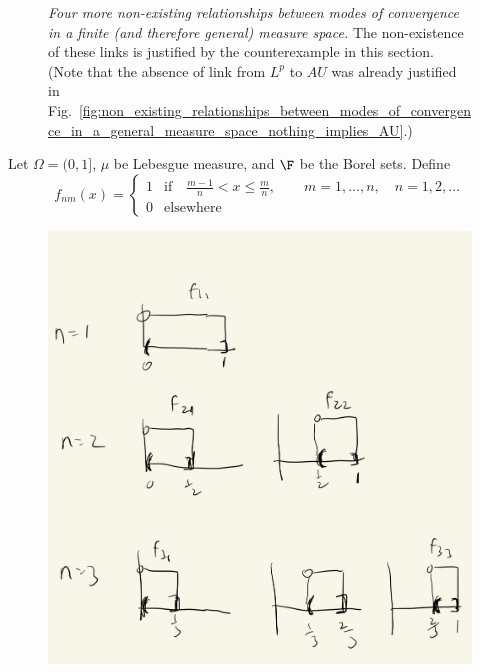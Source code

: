 \documentclass{article} %
\begin{document}
\begin{figure}[H]
\centering	
{}
\caption{ \textit{Four more non-existing relationships between modes of convergence in a finite (and therefore general) measure space.}  The non-existence of these links is justified by the counterexample in this section. (Note that the absence of link from $L^p$ to $AU$ was already justified in Fig.~\ref{fig:non_existing_relationships_between_modes_of_convergence_in_a_general_measure_space_nothing_implies_AU}.)}
\label{fig:non_existing_relationships_between_modes_of_convergence_Lp_and_measure_do_not_imply_AE_or_AU}
\end{figure}

Let $\Omega=(0,1]$, $\mu$ be Lebesgue measure, and $\F$ be the Borel sets.  Define
\[f_{nm}(x) =
\begin{cases}
1 & \text{if} \quad \frac{m-1}{n}  < x \leq \frac{m}{n}, \quad\quad m=1,\hdots,n, \quad n=1,2,\hdots \\
0 & \text{elsewhere}	
\end{cases}
 \]
 
\begin{figure}[H]
\centering
\includegraphics[width=.4\textwidth]{images/modes_of_convergence_counter_example_4}	
\caption{}
\label{fig:modes_of_convergence_counter_example_4}	
\end{figure}
\end{document}
